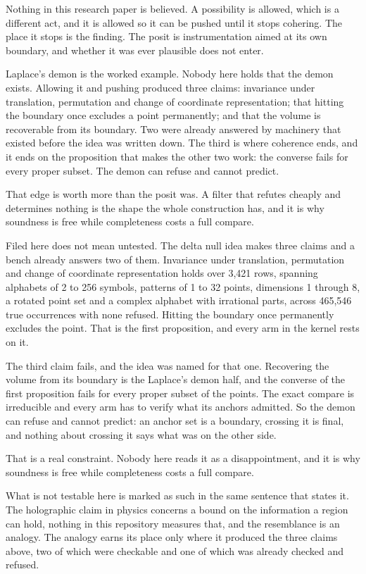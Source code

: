 Nothing in this research paper is believed. A possibility is allowed, which is a different act, and it is
allowed so it can be pushed until it stops cohering. The place it stops is the finding. The posit
is instrumentation aimed at its own boundary, and whether it was ever plausible does not enter.

Laplace's demon is the worked example. Nobody here holds that the demon exists. Allowing it and
pushing produced three claims: invariance under translation, permutation and change of coordinate
representation; that hitting the boundary once excludes a point permanently; and that the volume is
recoverable from its boundary. Two were already answered by machinery that existed before the idea
was written down. The third is where coherence ends, and it ends on the proposition that makes the
other two work: the converse fails for every proper subset. The demon can refuse and cannot
predict.

That edge is worth more than the posit was. A filter that refutes cheaply and determines nothing is
the shape the whole construction has, and it is why soundness is free while completeness costs a
full compare.

Filed here does not mean untested. The delta null idea makes three claims and a bench already
answers two of them. Invariance under translation, permutation and change of coordinate
representation holds over 3,421 rows, spanning alphabets of 2 to 256 symbols, patterns of 1 to 32
points, dimensions 1 through 8, a rotated point set and a complex alphabet with irrational parts,
across 465,546 true occurrences with none refused. Hitting the boundary once permanently excludes the
point. That is the first proposition, and every arm in the kernel rests on it.

The third claim fails, and the idea was named for that one. Recovering the volume from its
boundary is the Laplace's demon half, and the converse of the first proposition fails for every
proper subset of the points. The exact compare is irreducible and every arm has to verify what its
anchors admitted. So the demon can refuse and cannot predict: an anchor set is a boundary, crossing
it is final, and nothing about crossing it says what was on the other side.

That is a real constraint. Nobody here reads it as a disappointment, and it is why soundness is
free while completeness costs a full compare.

What is not testable here is marked as such in the same sentence that states it. The holographic
claim in physics concerns a bound on the information a region can hold, nothing in this repository
measures that, and the resemblance is an analogy. The analogy earns its place only where it produced
the three claims above, two of which were checkable and one of which was already checked and refused.
\cleardoublepage
